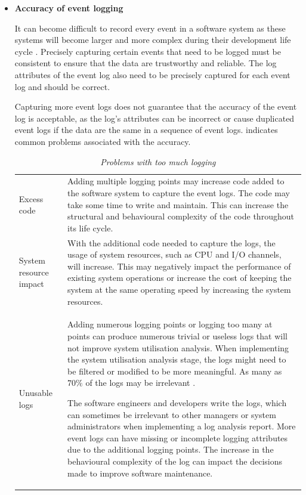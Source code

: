 \begin{itemize}
	\item \textbf{Accuracy of event logging}\par It can become difficult to record every event in a software system as these systems will become larger and more complex during their development life cycle \cite{Stojanov2017}. Precisely capturing certain events that need to be logged must be consistent to ensure that the data are trustworthy and reliable. The log attributes of the event log also need to be precisely captured for each event log and should be correct.\par Capturing more event logs does not guarantee that the accuracy of the event log is acceptable, as the log's attributes can be incorrect or cause duplicated event logs if the data are the same in a sequence of event logs.  indicates common problems associated with the accuracy.

	\begin{table}[!htb]
		\centering
		\caption[Problems with too much logging]
		{\textit{Problems with too much logging \cite{Zhu2015}}}
		\label{tbl:ch1_loggingTooMuch}
		\begin{tabularx}{\linewidth}{p{3cm}X}
			\toprule 
			\thead{Problem}  & \thead{Description} \\
			\midrule

			\rowcolor{lightgray}
			Excess code & Adding multiple logging points may increase code added to the software system to capture the event logs. The code may take some time to write and maintain. This can increase the structural and behavioural complexity of the code throughout its life cycle. \\

			System resource impact & With the additional code needed to capture the logs, the usage of system resources, such as CPU and I/O channels, will increase. This may negatively impact the performance of existing system operations or increase the cost of keeping the system at the same operating speed by increasing the system resources.\\

			\rowcolor{lightgray}
			Unusable logs & Adding numerous logging points or logging too many at points can produce numerous trivial or useless logs that will not improve system utilisation analysis. When implementing the system utilisation analysis stage, the logs might need to be filtered or modified to be more meaningful. As many as $70\%$ of the logs may be irrelevant \cite{Fedaghi2010}. \par The software engineers and developers write the logs, which can sometimes be irrelevant to other managers or system administrators when implementing a log analysis report. More event logs can have missing or incomplete logging attributes due to the additional logging points. The increase in the behavioural complexity of the log can impact the decisions made to improve software maintenance. \\
			\bottomrule
		\end{tabularx}
	\end{table}


\end{itemize}
